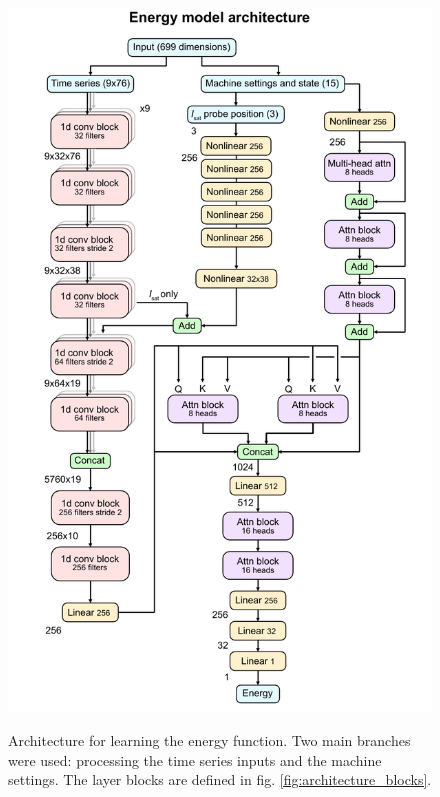 \begin{figure}
	\centering
	\includegraphics[height=550pt]{figures/architecture.pdf}
	\caption{\label{fig:architecture}Architecture for learning the energy function. Two main branches were used: processing the time series inputs and the machine settings. The layer blocks are defined in fig. \ref{fig:architecture_blocks}.}
\end{figure}

